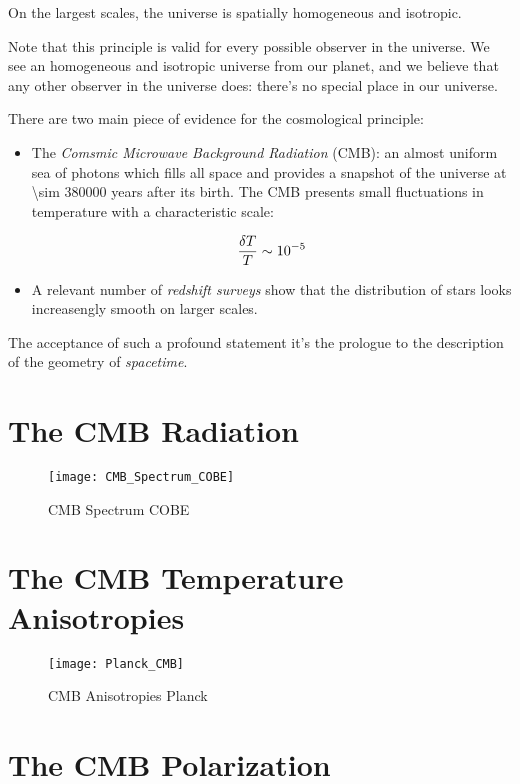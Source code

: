 \begin{principle}
        On the largest scales, the universe is spatially homogeneous and isotropic.
\end{principle}

Note that this principle is valid for every possible observer in the
universe. We see an homogeneous and isotropic universe from our planet, and
we believe that any other observer in the universe does: there's no special
place in our universe.

There are two main piece of evidence for the cosmological principle:

\begin{itemize}
        \item The \emph{Comsmic Microwave Background Radiation} (CMB): an almost
        uniform sea of photons which fills all space and provides a snapshot of the
        universe at \num{\sim 380000} years after its birth. The CMB
        presents small fluctuations in temperature with a characteristic
        scale:

        \begin{equation}
                \frac{\var{T}}{T} \sim \num{e-5}
        \end{equation}

        \item A relevant number of \emph{redshift surveys} show that the
        distribution of stars looks increasengly smooth on larger scales.
\end{itemize}

The acceptance of such a profound statement it's the prologue to the
description of the geometry of \emph{spacetime}. 

\section{The CMB Radiation}

\begin{figure}
        \centering
        \texttt{[image: CMB\_Spectrum\_COBE]}
        \caption{CMB Spectrum COBE}
        \label{fig:cmb_spectrum_cobe}
\end{figure}

\section{The CMB Temperature Anisotropies}

\begin{figure}
        \centering
        \texttt{[image: Planck\_CMB]}
        \caption{CMB Anisotropies Planck}
        \label{fig:plack_cmb}
\end{figure}

\section{The CMB Polarization}
